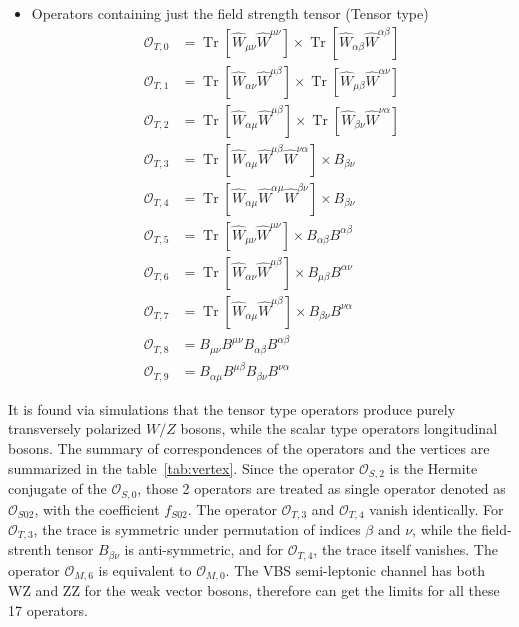 \begin{itemize}
\item Operators containing just the field strength tensor (Tensor type)
\begin{equation}
\begin{aligned}
\mathcal{O}_{T, 0} &=\operatorname{Tr}\left[\hat{W}_{\mu \nu} \hat{W}^{\mu \nu}\right] \times \operatorname{Tr}\left[\hat{W}_{\alpha \beta} \hat{W}^{\alpha \beta}\right] \\
\mathcal{O}_{T, 1} &=\operatorname{Tr}\left[\hat{W}_{\alpha \nu} \hat{W}^{\mu \beta}\right] \times \operatorname{Tr}\left[\hat{W}_{\mu \beta} \hat{W}^{\alpha \nu}\right] \\
\mathcal{O}_{T, 2} &=\operatorname{Tr}\left[\hat{W}_{\alpha \mu} \hat{W}^{\mu \beta}\right] \times \operatorname{Tr}\left[\hat{W}_{\beta \nu} \hat{W}^{\nu \alpha}\right] \\
\mathcal{O}_{T, 3} &=\operatorname{Tr}\left[\hat{W}_{\alpha \mu} \hat{W}^{\mu \beta} \hat{W}^{\nu \alpha}\right] \times B_{\beta \nu} \\
\mathcal{O}_{T, 4} &=\operatorname{Tr}\left[\hat{W}_{\alpha \mu} \hat{W}^{\alpha \mu} \hat{W}^{\beta \nu}\right] \times B_{\beta \nu} \\
\mathcal{O}_{T, 5} &=\operatorname{Tr}\left[\hat{W}_{\mu \nu} \hat{W}^{\mu \nu}\right] \times B_{\alpha \beta} B^{\alpha \beta} \\
\mathcal{O}_{T, 6} &=\operatorname{Tr}\left[\hat{W}_{\alpha \nu} \hat{W}^{\mu \beta}\right] \times B_{\mu \beta} B^{\alpha \nu} \\
\mathcal{O}_{T, 7} &=\operatorname{Tr}\left[\hat{W}_{\alpha \mu} \hat{W}^{\mu \beta}\right] \times B_{\beta \nu} B^{\nu \alpha} \\
\mathcal{O}_{T, 8} &=B_{\mu \nu} B^{\mu \nu} B_{\alpha \beta} B^{\alpha \beta} \\
\mathcal{O}_{T, 9} &=B_{\alpha \mu} B^{\mu \beta} B_{\beta \nu} B^{\nu \alpha}
\end{aligned}
\end{equation}
\end{itemize}

It is found via simulations that the tensor type operators produce purely transversely polarized $W/Z$ bosons, while the scalar type operators longitudinal bosons.
The summary of correspondences of the operators and the vertices are summarized in the table~\ref{tab:vertex}. 
Since the operator $\mathcal{O}_{S, 2}$ is the Hermite conjugate of the $\mathcal{O}_{S, 0}$, those 2 operators are treated as single operator denoted as $\mathcal{O}_{S02}$, with the coefficient $f_{S02}$. 
The operator $\mathcal{O}_{T, 3}$ and $\mathcal{O}_{T, 4}$ vanish identically. For $\mathcal{O}_{T, 3}$, the trace is symmetric under permutation of indices $\beta$ and $\nu$, while the field-strenth tensor $B_{\beta \nu}$ is anti-symmetric, and for $\mathcal{O}_{T, 4}$, the trace itself vanishes.
The operator $\mathcal{O}_{M, 6}$ is equivalent to $\mathcal{O}_{M, 0}$.
The VBS semi-leptonic channel has both WZ and ZZ for the weak vector bosons, therefore can get the limits for all these 17 operators.

